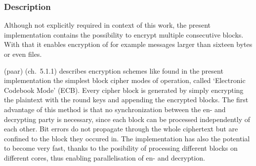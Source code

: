 \hypertarget{description-7}{%
\subsubsection{Description}\label{description-7}}

Although not explicitly required in context of this work, the present
implementation contains the possibility to encrypt multiple consecutive
blocks. With that it enables encryption of for example messages larger
than sixteen bytes or even files. 

(paar) (ch.~5.1.1) describes
encryption schemes like found in the present implementation the simplest
block cipher modes of operation, called `Electronic Codebook Mode'  (ECB).
Every cipher block is generated by simply encrypting the plaintext with
the round keys and appending the encrypted blocks. The first advantage
of this method is that no synchronization between the en- and decrypting
party is necessary, since each block can be processed independently of
each other. Bit errors do not propagate through the whole ciphertext but
are confined to the block they occured in. The implementation has also
the potential to become very fast, thanks to the posibility of
processing different blocks on different cores, thus enabling
parallelisation of en- and decryption. 

